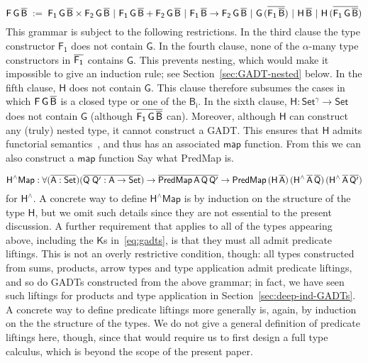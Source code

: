 \documentclass[9pt]{entcs}
\begin{document}
\[\mathsf{F\,G\,\overline{B}\; :=\;
F_1\,G\,\overline{B} \times F_2\,G\,\overline{B} \ \vert\ F_1\,G\,\overline{B} +
F_2\,G\,\overline{B} \ \vert\ F_1\,\overline{B} \to F_2\,G\,\overline{B}
\ \vert\ G\,(\overline{F_1\,\overline{B}}) \ \vert\ H\,\overline{B} \ \vert\ H\,
(\overline{F_1\,G\,\overline{B}}) }\]
This grammar is subject to the following
restrictions. In the third clause the type constructor $\mathsf{F_1}$
does not contain $\mathsf{G}$. In the fourth clause, none of the
$\mathsf{\alpha}$-many type constructors in $\mathsf{\overline{F_1}}$
contains $\mathsf{G}$.  This prevents nesting, which would make it
impossible to give an induction rule; see
Section~\ref{sec:GADT-nested} below. In the fifth clause, $\mathsf{H}$
does not contain $\mathsf{G}$. This clause therefore subsumes the
cases in which $\mathsf{F\,G\,\overline{B}}$ is a closed type or one of the
$\mathsf{B_i}$. In the sixth clause, $\mathsf{H : Set^\gamma \to Set}$
does not contain $\mathsf{G}$ (although $\overline{\mathsf{F_1\,G\,\overline{B}}}$
can). Moreover, although $\mathsf{H}$ can construct any (truly)
nested type, it cannot construct a GADT. This ensures that
$\mathsf{H}$ admits functorial semantics~\cite{jp20}, and thus has an
associated $\mathsf{map}$ function. From this we can also construct a
$\mathsf{map}$ function {\color{red} Say what PredMap is.}

\vspace*{-0.05in}

\[\mathsf{H^\wedge Map : \forall (\overline{A : Set}) (\overline{Q\;Q' : A \to Set}) 
\to \overline{PredMap\,A\,Q\,Q'} \to
PredMap\,(H\,\overline{A})\,(H^{\wedge}\,\overline{A}\,\overline{Q})\, 
(H^{\wedge}\,\overline{A}\,\overline{Q'})}\]
for $\mathsf{H^{\wedge}}$.  A
concrete way to define $\mathsf{H^\wedge Map}$ is by induction on the
structure of the type $\mathsf{H}$, but we omit such details since
they are not essential to the present discussion. A further
requirement that applies to all of the types appearing above,
including the $\mathsf{K}$s in~\eqref{eq:gadts}, is that they must all
admit predicate liftings. This is not an overly restrictive condition,
though: all types constructed from sums, products, arrow types and
type application admit predicate liftings, and so do GADTs constructed
from the above grammar; in fact, we have seen such liftings for
products and type application in Section~\ref{sec:deep-ind-GADTs}.  A
concrete way to define predicate liftings more generally is, again, by
induction on the the structure of the types. We do not give a general
definition of predicate liftings here, though, since that would
require us to first design a full type calculus, which is beyond the
scope of the present paper.
\end{document}
